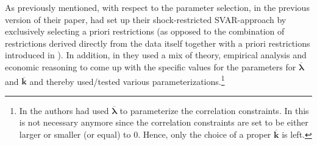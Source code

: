 \documentclass[a4paper,11pt,listof=nochaptergap,oneside,pointednumbers,bibtotoc,bigheadings,liststotoc,hidelinks]{scrbook}
\theoremstyle{mysatz}
\theoremstyle{mydefinition}
\theoremstyle{mytheorem}
\theoremstyle{mybemerkung}
\newcommand{\vect}[1]{\boldsymbol{\mathbf{#1}}}
\begin{document}
As previously mentioned, with respect to the parameter selection, in the previous version of their paper, \citet{ludvigsonetal:18} had set up their shock-restricted SVAR-approach by exclusively selecting a priori restrictions (as opposed to the combination of restrictions derived directly from the data itself together with a priori restrictions introduced in \citealp{ludvigsonetal:19}). In addition, in \citet{ludvigsonetal:18} they used a mix of theory, empirical analysis and economic reasoning to come up with the specific values for the parameters for $\overline{\vect{\lambda}}$ and $\overline{\vect{k}}$ and thereby used/tested various parameterizations.\footnote{In \citet{ludvigsonetal:18} the authors had used $\overline{\vect{\lambda}}$ to parameterize the correlation constraints. In \citet{ludvigsonetal:19} this is not necessary anymore since the correlation constraints are set to be either larger or smaller (or equal) to $0$. Hence, only the choice of a proper $\overline{\vect{k}}$ is left.} 
\end{document}
